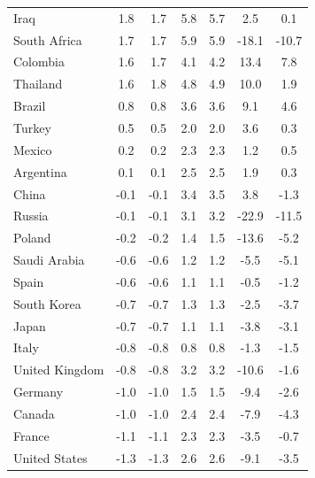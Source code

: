 \begin{tabular}[t]{lcccccc}
Iraq & 1.8 & 1.7 & 5.8 & 5.7 & 2.5 & 0.1\\
South Africa & 1.7 & 1.7 & 5.9 & 5.9 & -18.1 & -10.7\\
Colombia & 1.6 & 1.7 & 4.1 & 4.2 & 13.4 & 7.8\\
Thailand & 1.6 & 1.8 & 4.8 & 4.9 & 10.0 & 1.9\\
Brazil & 0.8 & 0.8 & 3.6 & 3.6 & 9.1 & 4.6\\
Turkey & 0.5 & 0.5 & 2.0 & 2.0 & 3.6 & 0.3\\
Mexico & 0.2 & 0.2 & 2.3 & 2.3 & 1.2 & 0.5\\
Argentina & 0.1 & 0.1 & 2.5 & 2.5 & 1.9 & 0.3\\
China & -0.1 & -0.1 & 3.4 & 3.5 & 3.8 & -1.3\\
Russia & -0.1 & -0.1 & 3.1 & 3.2 & -22.9 & -11.5\\
Poland & -0.2 & -0.2 & 1.4 & 1.5 & -13.6 & -5.2\\
Saudi Arabia & -0.6 & -0.6 & 1.2 & 1.2 & -5.5 & -5.1\\
Spain & -0.6 & -0.6 & 1.1 & 1.1 & -0.5 & -1.2\\
South Korea & -0.7 & -0.7 & 1.3 & 1.3 & -2.5 & -3.7\\
Japan & -0.7 & -0.7 & 1.1 & 1.1 & -3.8 & -3.1\\
Italy & -0.8 & -0.8 & 0.8 & 0.8 & -1.3 & -1.5\\
United Kingdom & -0.8 & -0.8 & 3.2 & 3.2 & -10.6 & -1.6\\
Germany & -1.0 & -1.0 & 1.5 & 1.5 & -9.4 & -2.6\\
Canada & -1.0 & -1.0 & 2.4 & 2.4 & -7.9 & -4.3\\
France & -1.1 & -1.1 & 2.3 & 2.3 & -3.5 & -0.7\\
United States & -1.3 & -1.3 & 2.6 & 2.6 & -9.1 & -3.5\\
\bottomrule
\end{tabular}